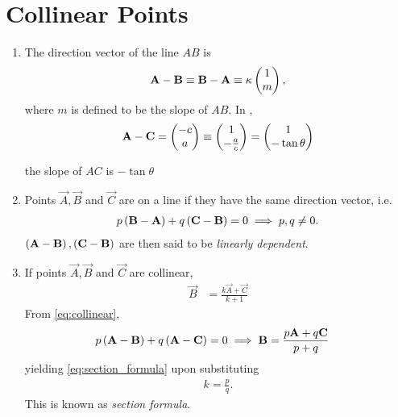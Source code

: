 \section{Collinear Points}
\begin{enumerate}[label=\thesection.\arabic*.,ref=\thesection.\theenumi]
\item The direction vector of the line $AB$ is
\begin{align}
	\mathbf{A}-
	\mathbf{B} \equiv
	\mathbf{B}-
	\mathbf{A} \equiv \kappa \begin{pmatrix}1 \\ m\end{pmatrix},
\end{align}
where $m$ is defined to be the slope of $AB$.
	In 
, 
\begin{align}
\mathbf{A}-\mathbf{C}
	=  \begin{pmatrix}-c \\ a\end{pmatrix} \equiv \begin{pmatrix}1 \\ -\frac{a}{c}\end{pmatrix} = \begin{pmatrix}1 \\ -\tan \theta\end{pmatrix}
\end{align}

		the slope of $AC$ is $-\tan \theta$
  \item Points $\vec{A},\vec{B}$ and $\vec{C}$ are on a line  if they have the same direction vector, i.e.
\begin{align}
	  \label{eq:collinear}
	p\brak{\vec{B}-\vec{A}}
	+ q\brak{\vec{C}-\vec{B}} = 0
	\implies p, q \ne 0.
\end{align}
	$\left(\mathbf{A}-\mathbf{B}\right),
	 \left(\mathbf{C}-\mathbf{B}\right)$
		are then said to be {\em linearly dependent}.
		\item If points $\vec{A}, \vec{B}$ and $\vec{C}$ are collinear, 
  \begin{align}
	  \vec{B}&= \frac{k\vec{A}+ \vec{C}}{k+1}
	  \label{eq:section_formula}
  \end{align}
  \solution From  
	  \eqref{eq:collinear},
	\begin{align}
	p\left(\mathbf{A}-\mathbf{B}\right)
		+ q\left(\mathbf{A}-\mathbf{C}\right) &= 0
		\implies \mathbf{B} = \frac{p\mathbf{A}+q\mathbf{C}}{p+q}
\end{align}
yielding 
	  \eqref{eq:section_formula}
	  upon substituting
\begin{align}
	k = \frac{p}{q}.
\end{align}
		This is known as {\em section formula}.


\end{enumerate}
